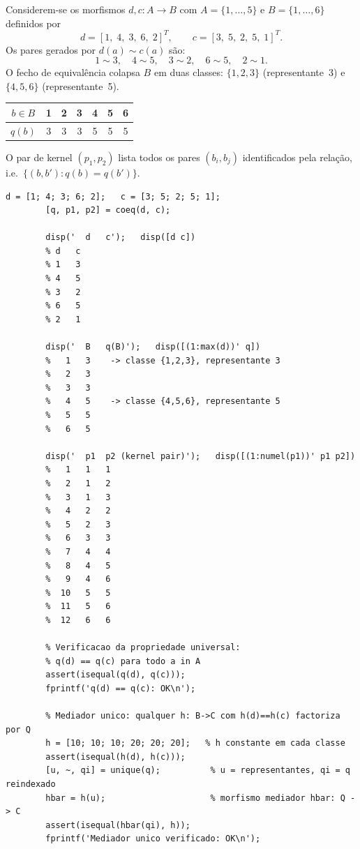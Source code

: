 \begin{example}
	\label{ex:coeq1}
	Considerem-se os morfismos $d, c : A \to B$ com
	$A = \{1,\ldots,5\}$ e $B = \{1,\ldots,6\}$ definidos por
	\[
	d = [1,\;4,\;3,\;6,\;2]^T, \qquad c = [3,\;5,\;2,\;5,\;1]^T.
	\]
	Os pares gerados por $d(a) \sim c(a)$ são:
	\[
	1\!\sim\!3,\quad 4\!\sim\!5,\quad 3\!\sim\!2,\quad 6\!\sim\!5,\quad 2\!\sim\!1.
	\]
	O fecho de equivalência colapsa $B$ em duas classes:
	$\{1,2,3\}$ (representante~3) e $\{4,5,6\}$ (representante~5).
	
	\medskip
	\begin{center}
		\begin{tabular}{ccccccc}
			\toprule
			$b \in B$ & 1 & 2 & 3 & 4 & 5 & 6 \\
			\midrule
			$q(b)$    & 3 & 3 & 3 & 5 & 5 & 5 \\
			\bottomrule
		\end{tabular}
	\end{center}
	\medskip
	
	O par de kernel $(p_1, p_2)$ lista todos os pares
	$(b_i, b_j)$ identificados pela relação, i.e.\
	$\{(b,b') : q(b)=q(b')\}$.
	
	\begin{lstlisting}[style=matlab, caption={Exemplo 1 de \texttt{coeq.m} --- duas classes}]
		d = [1; 4; 3; 6; 2];   c = [3; 5; 2; 5; 1];
		[q, p1, p2] = coeq(d, c);
		
		disp('  d   c');   disp([d c])
		% d   c
		% 1   3
		% 4   5
		% 3   2
		% 6   5
		% 2   1
		
		disp('  B   q(B)');   disp([(1:max(d))' q])
		%   1   3    -> classe {1,2,3}, representante 3
		%   2   3
		%   3   3
		%   4   5    -> classe {4,5,6}, representante 5
		%   5   5
		%   6   5
		
		disp('  p1  p2 (kernel pair)');   disp([(1:numel(p1))' p1 p2])
		%   1   1   1
		%   2   1   2
		%   3   1   3
		%   4   2   2
		%   5   2   3
		%   6   3   3
		%   7   4   4
		%   8   4   5
		%   9   4   6
		%  10   5   5
		%  11   5   6
		%  12   6   6
		
		% Verificacao da propriedade universal:
		% q(d) == q(c) para todo a in A
		assert(isequal(q(d), q(c)));
		fprintf('q(d) == q(c): OK\n');
		
		% Mediador unico: qualquer h: B->C com h(d)==h(c) factoriza por Q
		h = [10; 10; 10; 20; 20; 20];   % h constante em cada classe
		assert(isequal(h(d), h(c)));
		[u, ~, qi] = unique(q);          % u = representantes, qi = q reindexado
		hbar = h(u);                     % morfismo mediador hbar: Q -> C
		assert(isequal(hbar(qi), h));
		fprintf('Mediador unico verificado: OK\n');
	\end{lstlisting}
\end{example}

